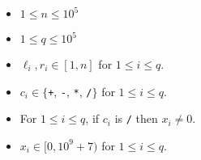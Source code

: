\begin{itemize}
\tightlist
\item $1 \le n \le 10^5$
\item $1 \le q \le 10^5$
\item $\ell_i, r_i \in [1, n]$ for $1\le i \le q$.
\item $c_i \in\{$\verb-+-, \verb+-+, \verb+*+, \verb+/+$\}$ 
      for $1\le i \le q$.
\item For $1\le i \le q$, if $c_i$ is \verb+/+ then $x_i \neq 0$.
\item $x_i \in [0, 10^9+7)$ for $1\le i \le q$.
\end{itemize}
\newpage


